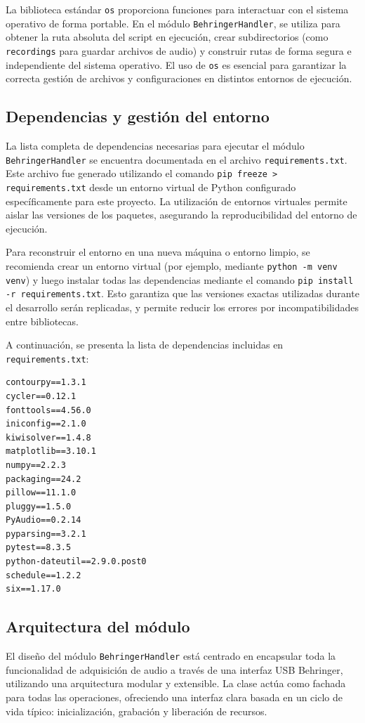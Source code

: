 La biblioteca estándar \texttt{os} proporciona funciones para interactuar con el sistema operativo de forma portable. En el módulo \texttt{BehringerHandler}, se utiliza para obtener la ruta absoluta del script en ejecución, crear subdirectorios (como \texttt{recordings} para guardar archivos de audio) y construir rutas de forma segura e independiente del sistema operativo.  El uso de \texttt{os} es esencial para garantizar la correcta gestión de archivos y configuraciones en distintos entornos de ejecución.


\subsection{Dependencias y gestión del entorno}

La lista completa de dependencias necesarias para ejecutar el módulo \texttt{BehringerHandler} se encuentra documentada en el archivo \texttt{requirements.txt}. Este archivo fue generado utilizando el comando \texttt{pip freeze > requirements.txt} desde un entorno virtual de Python configurado específicamente para este proyecto. La utilización de entornos virtuales permite aislar las versiones de los paquetes, asegurando la reproducibilidad del entorno de ejecución.

Para reconstruir el entorno en una nueva máquina o entorno limpio, se recomienda crear un entorno virtual (por ejemplo, mediante \texttt{python -m venv venv}) y luego instalar todas las dependencias mediante el comando \texttt{pip install -r requirements.txt}. Esto garantiza que las versiones exactas utilizadas durante el desarrollo serán replicadas, y permite reducir los  errores por incompatibilidades entre bibliotecas.

A continuación, se presenta la lista de dependencias incluidas en \texttt{requirements.txt}:

\begin{verbatim}
contourpy==1.3.1
cycler==0.12.1
fonttools==4.56.0
iniconfig==2.1.0
kiwisolver==1.4.8
matplotlib==3.10.1
numpy==2.2.3
packaging==24.2
pillow==11.1.0
pluggy==1.5.0
PyAudio==0.2.14
pyparsing==3.2.1
pytest==8.3.5
python-dateutil==2.9.0.post0
schedule==1.2.2
six==1.17.0
\end{verbatim}


\subsection{Arquitectura del módulo}

El diseño del módulo \texttt{BehringerHandler} está centrado en encapsular toda la funcionalidad de adquisición de audio a través de una interfaz USB Behringer, utilizando una arquitectura modular y extensible. La clase actúa como fachada para todas las operaciones, ofreciendo una interfaz clara basada en un ciclo de vida típico: inicialización, grabación y liberación de recursos.

